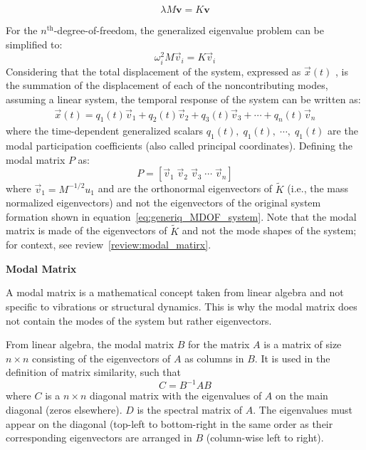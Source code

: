 \documentclass[12pt,letter]{article}
\begin{document}
\begin{equation}
	\lambda M \textbf{v} = K \textbf{v}
	\label{eq:generiq_MDOF_system}
\end{equation}

\pagebreak
For the $n^{\text{th}}$-degree-of-freedom, the generalized eigenvalue problem can be simplified to: 
\begin{equation}
	\omega_i^2 M \vec{v}_i = K  \vec{v}_i
\end{equation}
Considering that the total displacement of the system, expressed as $\vec{x}(t)$ , is the summation of the displacement of each of the noncontributing modes, assuming a linear system, the temporal response of the system can be written as:
\begin{eqnarray}
	\vec{x}(t) = q_1(t) \vec{v}_1 + q_2(t) \vec{v}_2 + q_3(t) \vec{v}_3 + \cdots + q_n(t) \vec{v}_n
	\label{eq:combination_of_modes}
\end{eqnarray}
\noindent where the time-dependent generalized scalars $q_1(t), \; q_1(t), \; \cdots, \; q_1(t)$ are the modal participation coefficients (also called principal coordinates). Defining the modal matrix $P$ as: 
\begin{equation}
	P = [ \vec{v}_1 \;  \vec{v}_2 \;  \vec{v}_3 \; \cdots \; \vec{v}_n]
\end{equation}
where $\vec{v}_1 = M^{-1/2}u_1$ and are the orthonormal eigenvectors of $\tilde{K}$ (i.e., the mass normalized eigenvectors) and not the eigenvectors of the original system formation shown in equation~\ref{eq:generiq_MDOF_system}. Note that the modal matrix is made of the eigenvectors of $\tilde{K}$ and not the mode shapes of the system; for context, see review~\ref{review:modal_matirx}.

\begin{review} 
	\label{review:modal_matirx}
	\textbf{Modal Matrix} 
	
	\noindent A modal matrix is a mathematical concept taken from linear algebra and not specific to vibrations or structural dynamics. This is why the modal matrix does not contain the modes of the system but rather eigenvectors. 
	
	From linear algebra, the modal matrix $B$ for the matrix $A$ is a matrix of size $n \times n$ consisting of the eigenvectors of $A$ as columns in $B$. It is used in the definition of matrix similarity, such that 
	\begin{equation}
		C = B^{-1}AB
	\end{equation}
	where $C$ is a $n \times n$ diagonal matrix with the eigenvalues of $A$ on the main diagonal (zeros elsewhere). $D$ is the spectral matrix of $A$. The eigenvalues must appear on the diagonal (top-left to bottom-right in the same order as their corresponding eigenvectors are arranged in $B$ (column-wise left to right).   
\end{review} 
\end{document}
